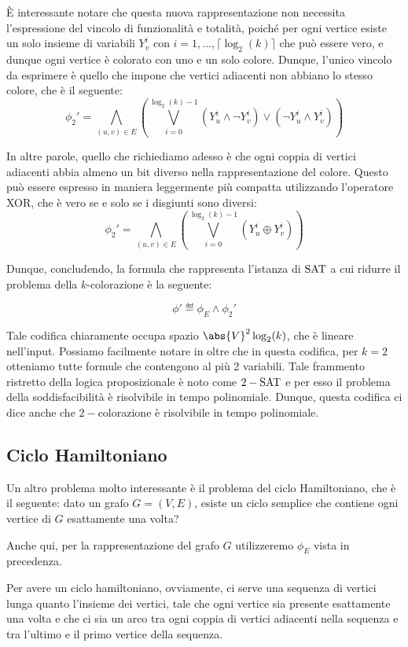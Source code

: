 È interessante notare che questa nuova rappresentazione non necessita l'espressione del vincolo di funzionalità e totalità, poiché per ogni vertice esiste un solo insieme di variabili \(Y_v^i\) con \(i=1,\dots,\lceil \log_2(k) \rceil\) che può essere vero, e dunque ogni vertice è colorato con uno e un solo colore. Dunque, l'unico vincolo da esprimere è quello che impone che vertici adiacenti non abbiano lo stesso colore, che è il seguente:
\[\phi_2' = \bigwedge_{(u,v)\in E}\left( \bigvee_{i=0}^{\log_2(k)-1} (Y_u^i \land \neg Y_v^i) \lor (\neg Y_u^i \land Y_v^i)\right)\] 

In altre parole, quello che richiediamo adesso è che ogni coppia di vertici adiacenti abbia almeno un bit diverso nella rappresentazione del colore. Questo può essere espresso in maniera leggermente più compatta utilizzando l'operatore XOR, che è vero se e solo se i disgiunti sono diversi:
\[\phi_2' = \bigwedge_{(u,v)\in E}\left( \bigvee_{i=0}^{\log_2(k)-1} (Y_u^i \oplus Y_v^i)\right)\]

Dunque, concludendo, la formula che rappresenta l'istanza di \(\Sat\) a cui ridurre il problema della \(k\)-colorazione è la seguente:

\[\phi' \eqdef \phi_E \land \phi_2'\]

Tale codifica chiaramente occupa spazio \(\abs{V}^2\log_2(k)\), che è lineare nell'input.
Possiamo facilmente notare in oltre che in questa codifica, per \(k=2\) otteniamo tutte formule che contengono al più 2 variabili.
Tale frammento ristretto della logica proposizionale è noto come \(2-\Sat\) e per esso il problema della soddisfacibilità è risolvibile in tempo polinomiale. Dunque, questa codifica ci dice anche che \(2-\)colorazione è risolvibile in tempo polinomiale.

\subsection{Ciclo Hamiltoniano}

Un altro problema molto interessante è il problema del ciclo Hamiltoniano, che è il seguente: dato un grafo \(G=(V,E)\), esiste un ciclo semplice che contiene ogni vertice di \(G\) esattamente una volta?

Anche qui, per la rappresentazione del grafo \(G\) utilizzeremo \(\phi_E\) vista in precedenza.

Per avere un ciclo hamiltoniano, ovviamente, ci serve una sequenza di vertici lunga quanto l'insieme dei vertici, tale che ogni vertice sia presente esattamente una volta e che ci sia un arco tra ogni coppia di vertici adiacenti nella sequenza e tra l'ultimo e il primo vertice della sequenza.

